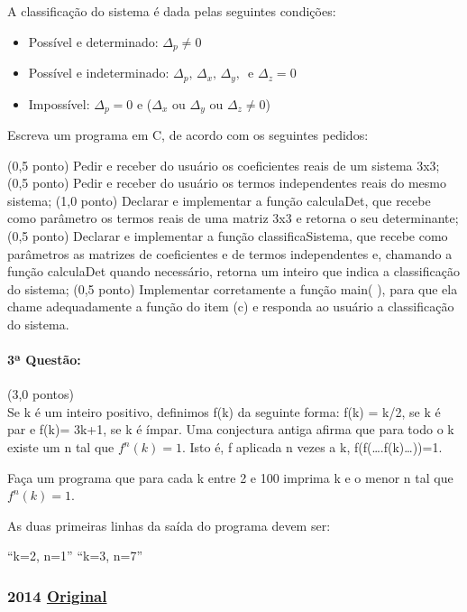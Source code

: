 \documentclass[12pt,a4paper]{article}
\newcommand{\original}[1]{\tiny \href{#1}{Original} \normalsize}
\begin{document}
A classificação do sistema é dada pelas seguintes condições:
\begin{itemize}
\item Possível e determinado: $\Delta _p \neq 0$
\item Possível e indeterminado: $\Delta_p,\, \Delta_x,\, \Delta_y,\,$ e $\Delta_z = 0$
\item Impossível: $\Delta_p = 0$ e ($\Delta_x$ ou $\Delta_y$ ou $\Delta_z \neq 0$)
\end{itemize}

Escreva um programa em C, de acordo com os seguintes pedidos:
\begin{tasks}
\task (0,5 ponto) Pedir e receber do usuário os coeficientes reais de um sistema 3x3;
\task (0,5 ponto) Pedir e receber do usuário os termos independentes reais do mesmo sistema;
\task (1,0 ponto) Declarar e implementar a função calculaDet, que recebe como parâmetro os termos reais de uma matriz 3x3 e retorna o seu determinante;
\task (0,5 ponto) Declarar e implementar a função classificaSistema, que recebe como parâmetros as matrizes de coeficientes e de termos independentes e, chamando a função calculaDet quando necessário, retorna um inteiro que indica a classificação do sistema;
\task (0,5 ponto) Implementar corretamente a função main( ), para que ela chame adequadamente a função do item (c) e responda ao usuário a classificação do sistema.
\end{tasks}

\paragraph{3ª Questão:} (3,0 pontos)\\
Se k é um inteiro positivo, definimos f(k) da seguinte forma:
f(k) = k/2, se k é par e f(k)= 3k+1, se k é ímpar. Uma conjectura antiga afirma que para todo o k existe um n tal que $f^n (k) = 1$. Isto é, f aplicada n vezes a k, f(f(\dots.f(k)\dots))=1.

Faça um programa que para cada k entre 2 e 100 imprima k e o menor n tal que $f^n (k) = 1$.

As duas primeiras linhas da saída do programa devem ser:

“k=2, n=1”
“k=3, n=7”

\newpage


\subsubsection{2014 \original{https://drive.google.com/file/d/1_x_LB8heEhzLLyMHgnHf0508rarUicIz/view?usp=sharing}}
\end{document}
